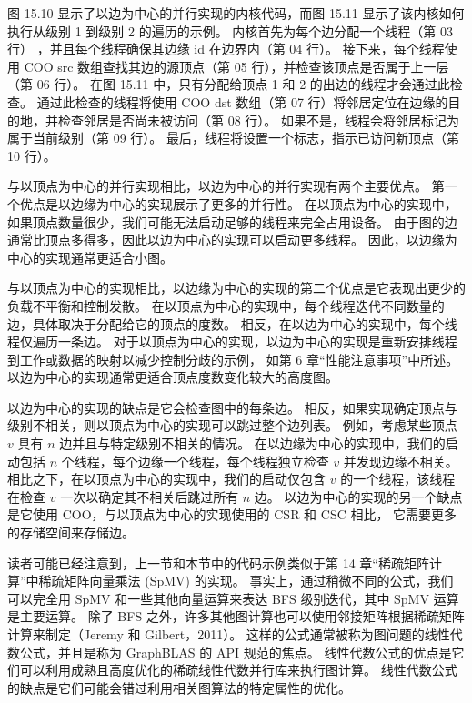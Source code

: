 图 15.10 显示了以边为中心的并行实现的内核代码，而图 15.11 显示了该内核如何执行从级别 1 到级别 2 的遍历的示例。
内核首先为每个边分配一个线程（第 03 行） ，并且每个线程确保其边缘 id 在边界内（第 04 行）。 
接下来，每个线程使用 COO src 数组查找其边的源顶点（第 05 行），并检查该顶点是否属于上一层（第 06 行）。 
在图 15.11 中，只有分配给顶点 1 和 2 的出边的线程才会通过此检查。 
通过此检查的线程将使用 COO dst 数组（第 07 行）将邻居定位在边缘的目的地，并检查邻居是否尚未被访问（第 08 行）。 
如果不是，线程会将邻居标记为属于当前级别（第 09 行）。 最后，线程将设置一个标志，指示已访问新顶点（第 10 行）。

与以顶点为中心的并行实现相比，以边为中心的并行实现有两个主要优点。 第一个优点是以边缘为中心的实现展示了更多的并行性。 
在以顶点为中心的实现中，如果顶点数量很少，我们可能无法启动足够的线程来完全占用设备。 
由于图的边通常比顶点多得多，因此以边为中心的实现可以启动更多线程。 因此，以边缘为中心的实现通常更适合小图。

与以顶点为中心的实现相比，以边缘为中心的实现的第二个优点是它表现出更少的负载不平衡和控制发散。 
在以顶点为中心的实现中，每个线程迭代不同数量的边，具体取决于分配给它的顶点的度数。 
相反，在以边为中心的实现中，每个线程仅遍历一条边。 
对于以顶点为中心的实现，以边为中心的实现是重新安排线程到工作或数据的映射以减少控制分歧的示例，
如第 6 章“性能注意事项”中所述。 以边为中心的实现通常更适合顶点度数变化较大的高度图。

以边为中心的实现的缺点是它会检查图中的每条边。 相反，如果实现确定顶点与级别不相关，则以顶点为中心的实现可以跳过整个边列表。 
例如，考虑某些顶点 $v$ 具有 $n$ 边并且与特定级别不相关的情况。 
在以边缘为中心的实现中，我们的启动包括 $n$ 个线程，每个边缘一个线程，每个线程独立检查 $v$ 并发现边缘不相关。 
相比之下，在以顶点为中心的实现中，我们的启动仅包含 $v$ 的一个线程，该线程在检查 $v$ 一次以确定其不相关后跳过所有 $n$ 边。 
以边为中心的实现的另一个缺点是它使用 $\mathrm{COO}$，与以顶点为中心的实现使用的 CSR 和 CSC 相比，
它需要更多的存储空间来存储边。

读者可能已经注意到，上一节和本节中的代码示例类似于第 14 章“稀疏矩阵计算”中稀疏矩阵向量乘法 (SpMV) 的实现。 
事实上，通过稍微不同的公式，我们可以完全用 SpMV 和一些其他向量运算来表达 BFS 级别迭代，其中 SpMV 运算是主要运算。 
除了 BFS 之外，许多其他图计算也可以使用邻接矩阵根据稀疏矩阵计算来制定（Jeremy 和 Gilbert，2011）。 
这样的公式通常被称为图问题的线性代数公式，并且是称为 GraphBLAS 的 API 规范的焦点。 
线性代数公式的优点是它们可以利用成熟且高度优化的稀疏线性代数并行库来执行图计算。 
线性代数公式的缺点是它们可能会错过利用相关图算法的特定属性的优化。

